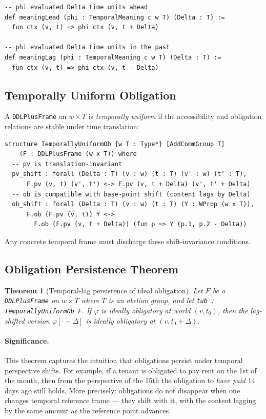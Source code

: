 \documentclass[]{article}
\newtheorem{theorem}{Theorem}
\newcommand{\code}[1]{\texttt{#1}}
\begin{document}
\begin{lstlisting}
-- phi evaluated Delta time units ahead
def meaningLead (phi : TemporalMeaning c w T) (Delta : T) :=
  fun ctx (v, t) => phi ctx (v, t + Delta)

-- phi evaluated Delta time units in the past
def meaningLag (phi : TemporalMeaning c w T) (Delta : T) :=
  fun ctx (v, t) => phi ctx (v, t - Delta)
\end{lstlisting}

\subsection{Temporally Uniform Obligation}

A \code{DDLPlusFrame} on $w \times T$ is \emph{temporally uniform} if the
accessibility and obligation relations are stable under time translation:

\begin{lstlisting}
structure TemporallyUniformOb {w T : Type*} [AddCommGroup T]
    (F : DDLPlusFrame (w x T)) where
  -- pv is translation-invariant
  pv_shift : forall (Delta : T) (v : w) (t : T) (v' : w) (t' : T),
      F.pv (v, t) (v', t') <-> F.pv (v, t + Delta) (v', t' + Delta)
  -- ob is compatible with base-point shift (content lags by Delta)
  ob_shift : forall (Delta : T) (v : w) (t : T) (Y : WProp (w x T)),
      F.ob (F.pv (v, t)) Y <->
        F.ob (F.pv (v, t + Delta)) (fun p => Y (p.1, p.2 - Delta))
\end{lstlisting}

\noindent
Any concrete temporal frame must discharge these shift-invariance conditions.

\subsection{Obligation Persistence Theorem}

\begin{theorem}[Temporal-lag persistence of ideal obligation]
\label{thm:temporal}
Let $F$ be a \code{DDLPlusFrame} on $w \times T$ where $T$ is an abelian group,
and let \code{tub : TemporallyUniformOb F}.  If $\varphi$ is ideally obligatory
at world $(v, t_0)$, then the lag-shifted version $\varphi[\cdot - \Delta]$
is ideally obligatory at $(v, t_0 + \Delta)$.
\end{theorem}

\paragraph{Significance.}
This theorem captures the intuition that obligations persist under
temporal perspective shifts.  For example, if a tenant is obligated to pay
rent on the 1st of the month, then from the perspective of the 15th the
obligation to \emph{have paid} 14 days ago still holds.  More precisely:
obligations do not disappear when one changes temporal reference frame ---
they shift with it, with the content lagging by the same amount as the
reference point advances.
\end{document}
